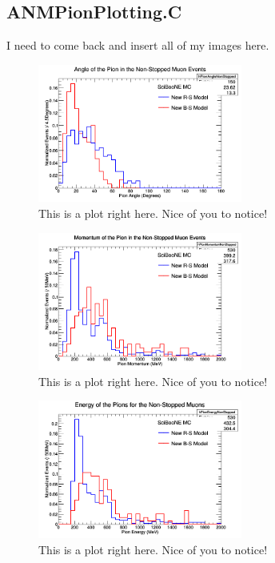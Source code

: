 \documentclass[11pt]{article}
\begin{document}
\subsection{ANMPionPlotting.C}
I need to come back and insert all of my images here.

\begin{figure}[H]
\centering
\includegraphics[width=0.6\textwidth]{ANMPionPlottingImages/1-ANMPionPlotting.png}
\caption{This is a plot right here. Nice of you to notice!}
\end{figure}

\begin{figure}[H]
\centering
\includegraphics[width=0.6\textwidth]{ANMPionPlottingImages/2-ANMPionPlotting.png}
\caption{This is a plot right here. Nice of you to notice!}
\end{figure}

\begin{figure}[H]
\centering
\includegraphics[width=0.6\textwidth]{ANMPionPlottingImages/3-ANMPionPlotting.png}
\caption{This is a plot right here. Nice of you to notice!}
\end{figure}
\end{document}
